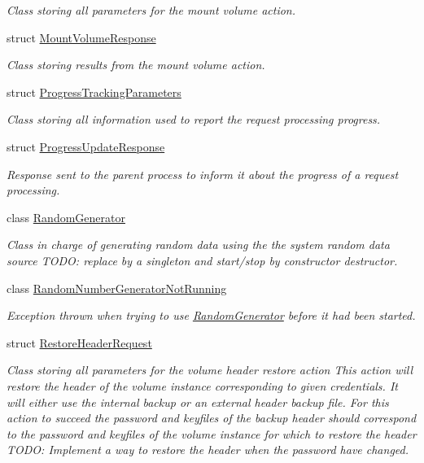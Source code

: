\begin{DoxyCompactItemize}
\begin{DoxyCompactList}\small\item\em Class storing all parameters for the mount volume action. \end{DoxyCompactList}\item 
struct \hyperlink{struct_gost_crypt_1_1_core_1_1_mount_volume_response}{Mount\+Volume\+Response}
\begin{DoxyCompactList}\small\item\em Class storing results from the mount volume action. \end{DoxyCompactList}\item 
struct \hyperlink{struct_gost_crypt_1_1_core_1_1_progress_tracking_parameters}{Progress\+Tracking\+Parameters}
\begin{DoxyCompactList}\small\item\em Class storing all information used to report the request processing progress. \end{DoxyCompactList}\item 
struct \hyperlink{struct_gost_crypt_1_1_core_1_1_progress_update_response}{Progress\+Update\+Response}
\begin{DoxyCompactList}\small\item\em Response sent to the parent process to inform it about the progress of a request processing. \end{DoxyCompactList}\item 
class \hyperlink{class_gost_crypt_1_1_core_1_1_random_generator}{Random\+Generator}
\begin{DoxyCompactList}\small\item\em Class in charge of generating random data using the the system random data source T\+O\+DO\+: replace by a singleton and start/stop by constructor destructor. \end{DoxyCompactList}\item 
class \hyperlink{class_gost_crypt_1_1_core_1_1_random_number_generator_not_running}{Random\+Number\+Generator\+Not\+Running}
\begin{DoxyCompactList}\small\item\em Exception thrown when trying to use \hyperlink{class_gost_crypt_1_1_core_1_1_random_generator}{Random\+Generator} before it had been started. \end{DoxyCompactList}\item 
struct \hyperlink{struct_gost_crypt_1_1_core_1_1_restore_header_request}{Restore\+Header\+Request}
\begin{DoxyCompactList}\small\item\em Class storing all parameters for the volume header restore action This action will restore the header of the volume instance corresponding to given credentials. It will either use the internal backup or an external header backup file. For this action to succeed the password and keyfiles of the backup header should correspond to the password and keyfiles of the volume instance for which to restore the header T\+O\+DO\+: Implement a way to restore the header when the password have changed. \end{DoxyCompactList}\item 

\end{DoxyCompactItemize}
